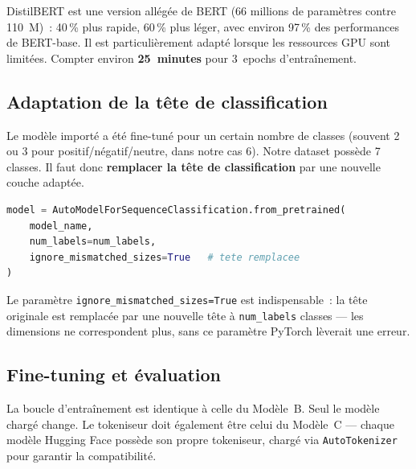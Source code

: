 \documentclass[12pt,a4paper]{report}
\begin{document}
\begin{tip}
DistilBERT est une version allégée de BERT (66 millions de paramètres contre 110~M)~:
40\,\% plus rapide, 60\,\% plus léger, avec environ 97\,\% des performances de
BERT-base. Il est particulièrement adapté lorsque les ressources GPU sont limitées.
Compter environ \textbf{25~minutes} pour 3~epochs d'entraînement.
\end{tip}

\subsection{Adaptation de la tête de classification}

Le modèle importé a été fine-tuné pour un certain nombre de classes (souvent 2 ou 3
pour positif/négatif/neutre, dans notre cas 6). Notre dataset possède 7 classes. Il faut donc
\textbf{remplacer la tête de classification} par une nouvelle couche adaptée.

\begin{lstlisting}[language=Python]
model = AutoModelForSequenceClassification.from_pretrained(
    model_name,
    num_labels=num_labels,
    ignore_mismatched_sizes=True   # tete remplacee
)
\end{lstlisting}

Le paramètre \texttt{ignore\_mismatched\_sizes=True} est indispensable~: la tête
originale est remplacée par une nouvelle tête à \texttt{num\_labels}
classes — les dimensions ne correspondent plus, sans ce paramètre PyTorch lèverait
une erreur.

\subsection{Fine-tuning et évaluation}

La boucle d'entraînement est identique à celle du Modèle~B. Seul le modèle chargé
change. Le tokeniseur doit également être celui du Modèle~C — chaque modèle Hugging
Face possède son propre tokeniseur, chargé via \texttt{AutoTokenizer} pour garantir la
compatibilité.
\end{document}

